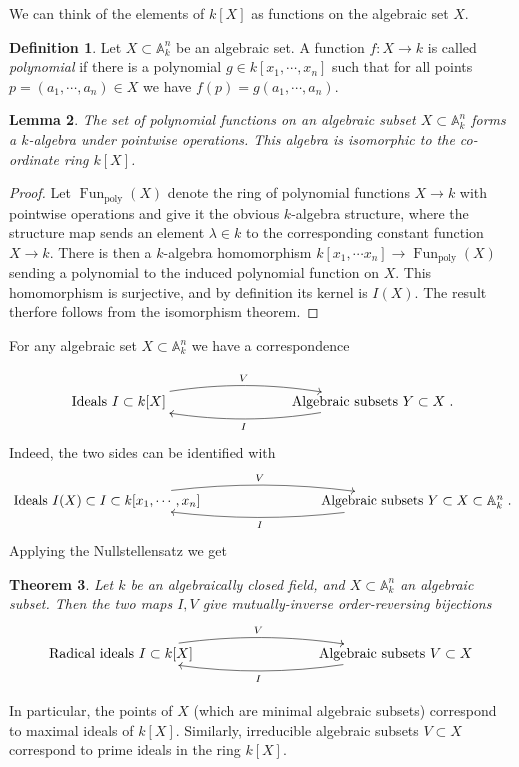 \documentclass [12pt,oneside,a4paper,mathscr]{amsart}
\newtheorem{thm}{Theorem}[section]
\newtheorem{lemma}[thm]{Lemma}
\theoremstyle{definition}
\newtheorem{defn}[thm]{Definition}
\newcommand {\A}{\mathbb A}
\newcommand{\Fun}{\operatorname{Fun}}
\begin{document}
We can think of the elements of $k[X]$ as functions on the algebraic set $X$.

\begin{defn}
Let  $X\subset \A^n_k$ be an algebraic set. A function $f\colon X \to k$ is called \emph{polynomial} if there is a polynomial $g\in k[x_1,\cdots, x_n]$ such that for all points $p=(a_1,\cdots,a_n)\in X$ we have $f(p)=g(a_1,\cdots,a_n)$.
\end{defn}


\begin{lemma}
The set of polynomial functions on an algebraic subset $X\subset \A^n_k$  forms a  $k$-algebra  under pointwise operations. This algebra is isomorphic to the co-ordinate ring $k[X]$.
\end{lemma}


\begin{proof}
Let $\Fun_{\operatorname{poly}}(X)$ denote the ring of polynomial functions $X\to k$ with pointwise operations and give it the obvious $k$-algebra structure, where the structure map sends an element $\lambda\in k$ to the corresponding constant function $X\to k$. There is then a $k$-algebra homomorphism $k[x_1,\cdots x_n]\to \Fun_{\operatorname{poly}}(X)$ sending a polynomial to the induced polynomial function on $X$. This homomorphism is surjective, and by definition its  kernel is $I(X)$. The result therfore follows from the isomorphism theorem.
\end{proof}





For any algebraic set $X\subset \A^n_k$ we have a correspondence

\[\xymatrix{ {\text{Ideals }I\subset k[X]} \ar@/^1pc/[rrr]^{V} &&& {\text{Algebraic subsets }Y\subset X} \ar@/^1pc/[lll]^{I}}.\]
Indeed, the two sides can be identified with 
\[
\xymatrix{ {\text{Ideals }I(X)\subset I\subset k[x_1,\cdots,x_n]} \ar@/^1pc/[rrr]^{V} &&& {\text{Algebraic subsets }Y \subset X\subset \A^n_k} \ar@/^1pc/[lll]^{I}}.\]
Applying the Nullstellensatz we get

\begin{thm}
Let $k$ be an algebraically closed field, and $X\subset \A^n_k$ an algebraic subset. Then
the  two maps $I,V$  give mutually-inverse  order-reversing bijections
\[\xymatrix{ {\text{Radical ideals }I\subset k[X]} \ar@/^1pc/[rrr]^{V} &&& {\text{Algebraic subsets }V\subset X} \ar@/^1pc/[lll]^{I}}\]
\end{thm}


In particular, the points of $X$ (which are minimal algebraic subsets) correspond to maximal ideals of $k[X]$. Similarly, irreducible algebraic subsets $V\subset X$ correspond to prime ideals in the ring $k[X]$.
\end{document}
